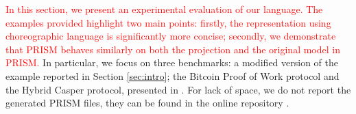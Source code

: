\textcolor{red}{In this section, we present an experimental evaluation of our language.
The examples provided highlight two main points: firstly, the representation using choreographic language is significantly more concise; secondly, we demonstrate that PRISM behaves similarly on both the projection and the original model in PRISM. }
In particular, we focus on three benchmarks: a modified version of the example reported in Section \ref{sec:intro};
the Bitcoin Proof of Work protocol and the Hybrid Casper protocol,
presented in
\cite{DBLP:journals/concurrency/BistarelliNGLMV23,DBLP:journals/distribledger/GallettaLMV23}.
For lack of space, we do not report the generated PRISM files, they
can be found in the online repository \cite{repository}.

